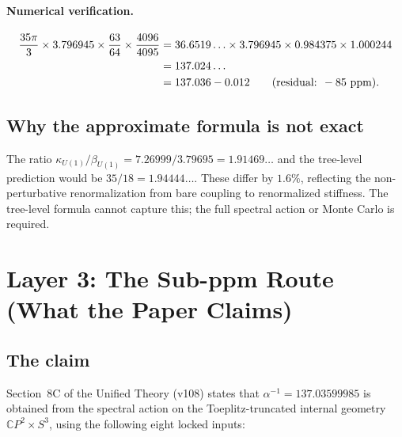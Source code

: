 \documentclass[12pt,a4paper]{article}
\theoremstyle{definition}
\begin{document}
\paragraph{Numerical verification.}
\begin{align}
\frac{35\pi}{3} \times 3.796945 \times \frac{63}{64} \times \frac{4096}{4095}
&= 36.6519\ldots \times 3.796945 \times 0.984375 \times 1.000244 \notag\\
&= 137.024\ldots \notag\\
&= 137.036 - 0.012 \qquad (\text{residual: } -85\text{ ppm}).
\end{align}

\subsection{Why the approximate formula is not exact}

The ratio $\kappa_{U(1)}/\beta_{U(1)} = 7.26999/3.79695 = 1.91469\ldots$
and the tree-level prediction would be $35/18 = 1.94444\ldots$.
These differ by $1.6\%$, reflecting the non-perturbative renormalization
from bare coupling to renormalized stiffness.  The tree-level formula
cannot capture this; the full spectral action or Monte Carlo is required.

\section{Layer 3: The Sub-ppm Route (What the Paper Claims)}
\label{sec:layer3}

\subsection{The claim}

Section~8C of the Unified Theory (v108) states that $\alpha^{-1} = 137.03599985$
is obtained from the spectral action on the Toeplitz-truncated internal geometry
$\mathbb{C}P^2 \times S^3$, using the following eight locked inputs:
\end{document}
